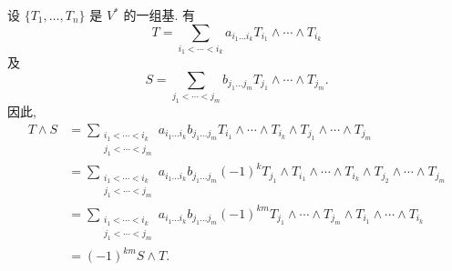 \begin{description}[font=\normalfont,leftmargin=2em,labelwidth=1.5em]
设 $\{T_1,\ldots,T_n\}$ 是 $V^*$ 的一组基. 有
\[
  T=\sum_{i_1<\cdots<i_k}a_{i_1\ldots i_k}T_{i_1}\wedge\cdots\wedge T_{i_k}
\]
及
\[
  S=\sum_{j_1<\cdots<j_m}b_{j_1\ldots j_m}T_{j_1}\wedge\cdots\wedge T_{j_m}.
\]
因此,
\begin{align*}
  T\wedge S
  &=\sum_{\substack{i_1<\cdots<i_k\\j_1<\cdots<j_m}}
     a_{i_1\ldots i_k}b_{j_1\ldots j_m}
     T_{i_1}\wedge\cdots\wedge T_{i_k}\wedge T_{j_1}\wedge\cdots\wedge T_{j_m}\\
  &=\sum_{\substack{i_1<\cdots<i_k\\j_1<\cdots<j_m}}
     a_{i_1\ldots i_k}b_{j_1\ldots j_m}(-1)^k
     T_{j_1}\wedge T_{i_1}\wedge\cdots\wedge T_{i_k}\wedge T_{j_2}\wedge\cdots\wedge T_{j_m}\\
  &=\sum_{\substack{i_1<\cdots<i_k\\j_1<\cdots<j_m}}
     a_{i_1\ldots i_k}b_{j_1\ldots j_m}(-1)^{km}
     T_{j_1}\wedge\cdots\wedge T_{j_m}\wedge T_{i_1}\wedge\cdots\wedge T_{i_k}\\
  &=(-1)^{km}S\wedge T.
\end{align*}


\end{description}

